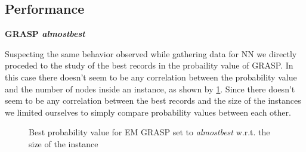 \subsection{Performance}

\textbf{GRASP \textit{almostbest}}

Suspecting the same behavior observed while gathering data for NN we directly proceded to the study of the best records in the probaility value of GRASP.
In this case there doesn't seem to be any correlation between the probability value and the number of nodes inside an instance, as shown by \figurename{ \ref{fig:emAlmostbestFunction}}.
Since there doesn't seem to be any correlation between the best records and the size of the instances we limited ourselves to simply compare probability values between each other.

\begin{figure}[htbp]
	\centering
	\caption{Best probability value for EM GRASP set to \textit{almostbest} w.r.t. the size of the instance}
    \label{fig:emAlmostbestFunction}
\end{figure}

